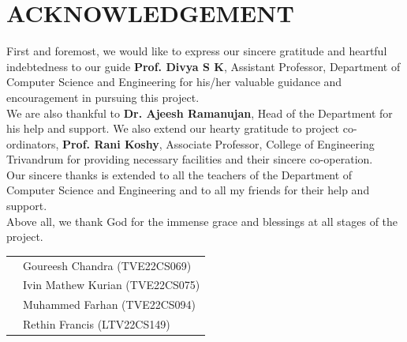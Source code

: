 \section*{\centering ACKNOWLEDGEMENT}

First and foremost, we would like to express our sincere gratitude and heartful indebtedness to our guide \textbf{Prof. Divya S K}, Assistant Professor, Department of Computer Science and Engineering for his/her valuable guidance and encouragement in pursuing this project.\\



We are also thankful to \textbf{Dr. Ajeesh Ramanujan}, Head of the Department for his
help and support. We also extend our hearty gratitude to project co-ordinators, \textbf{Prof. Rani Koshy}, Associate Professor,
College of Engineering Trivandrum for providing necessary facilities and their sincere co-operation.\\

Our sincere thanks is extended to all the teachers of the Department of Computer Science and Engineering and to all my friends for their help and support.\\
Above all, we thank God for the immense grace and blessings at all stages of the project.\\

\begin{tabular}{ p{7.5cm} p{6cm} } 
    & Goureesh Chandra (TVE22CS069) \\ 
    & Ivin Mathew Kurian (TVE22CS075) \\
    & Muhammed Farhan (TVE22CS094) \\
    & Rethin Francis (LTV22CS149) \\
\end{tabular}
\newpage